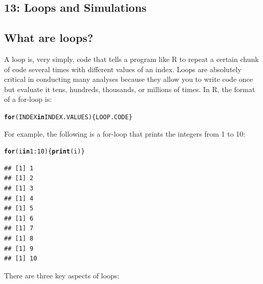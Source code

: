 \documentclass{tufte-book}\usepackage[]{graphicx}\usepackage[]{color}
\makeatletter
\newcommand{\hlnum}[1]{\textcolor[rgb]{0.686,0.059,0.569}{#1}}%
\newcommand{\hlopt}[1]{\textcolor[rgb]{0,0,0}{#1}}%
\newcommand{\hlstd}[1]{\textcolor[rgb]{0.345,0.345,0.345}{#1}}%
\newcommand{\hlkwa}[1]{\textcolor[rgb]{0.161,0.373,0.58}{\textbf{#1}}}%
\newcommand{\hlkwd}[1]{\textcolor[rgb]{0.737,0.353,0.396}{\textbf{#1}}}%
\newenvironment{kframe}{%
 \def\at@end@of@kframe{}%
 \ifinner\ifhmode%
  \def\at@end@of@kframe{\end{minipage}}%
  \begin{minipage}{\columnwidth}%
 \fi\fi%
 \def\FrameCommand##1{\hskip\@totalleftmargin \hskip-\fboxsep
 \colorbox{shadecolor}{##1}\hskip-\fboxsep
     \hskip-\linewidth \hskip-\@totalleftmargin \hskip\columnwidth}%
 \MakeFramed {\advance\hsize-\width
   \@totalleftmargin\z@ \linewidth\hsize
   \@setminipage}}%
 {\par\unskip\endMakeFramed%
 \at@end@of@kframe}
\newenvironment{knitrout}{}{} %
\makeatother
\begin{document}
\begin{footnotesize}
\chapter{13: Loops and Simulations}
\label{ch:13}

\section{What are loops?}

A loop is, very simply, code that tells a program like R to repeat a certain chunk of code several times with different values of an index. Loops are absolutely critical in conducting many analyses because they allow you to write code once but evaluate it tens, hundreds, thousands, or millions of times. In R, the format of a for-loop is:

\begin{knitrout}
\color{fgcolor}\begin{kframe}
\begin{alltt}
\hlkwa{for}\hlstd{(INDEX} \hlkwa{in} \hlstd{INDEX.VALUES) \{LOOP.CODE\}}
\end{alltt}
\end{kframe}
\end{knitrout}

For example, the following is a for-loop that prints the integers from 1 to 10:

\begin{knitrout}
\color{fgcolor}\begin{kframe}
\begin{alltt}
\hlkwa{for} \hlstd{(i} \hlkwa{in} \hlnum{1}\hlopt{:}\hlnum{10}\hlstd{) \{}\hlkwd{print}\hlstd{(i)\}}
\end{alltt}
\begin{verbatim}
## [1] 1
## [1] 2
## [1] 3
## [1] 4
## [1] 5
## [1] 6
## [1] 7
## [1] 8
## [1] 9
## [1] 10
\end{verbatim}
\end{kframe}
\end{knitrout}

There are three key aspects of loops:

\begin{enumerate}


\end{enumerate}
\end{footnotesize}
\end{document}
